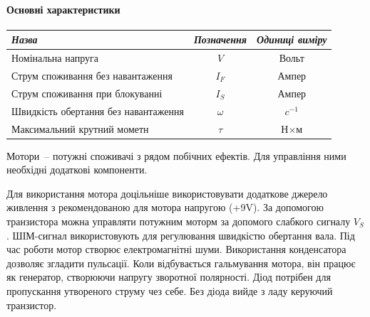 \documentclass[12pt,a4paper]{book}  %
\begin{document}
\paragraph{Основні характеристики}
\begin{center}
\begin{tabular}{|l|c|c|}
\hline
\textit{Назва} & \textit{Позначення} & \textit{Одиниці виміру} \\
\hline
Номінальна напруга & $V$ & Вольт \\
\hline		
Струм споживання без навантаження & $I_F$ & Ампер \\
\hline
Струм споживання при блокуванні & $I_S$ & Ампер \\
\hline
Швидкість обертання без навантаження & $\omega$ & $c^{-1}$ \\
\hline
Максимальний крутний мометн & $\tau$ & Н$\times$м \\
\hline
\end{tabular}
\end{center}

Мотори~-- потужні споживачі з рядом побічних ефектів. Для управління ними необхідні додаткові компоненти.

Для використання мотора доцільніше використовувати додаткове джерело живлення з рекомендованою для мотора напругою (+9V).
За допомогою транзистора можна управляти потужним моторм за допомого слабкого сигналу $V_S$.
ШІМ-сигнал використовують для регулювання швидкістю обертання вала.
Під час роботи мотор створює електромагнітні шуми. Використання конденсатора дозволяє згладити пульсації.
Коли відбувається гальмування мотора, він працює як генератор, створюючи напругу зворотної полярності. Діод потрібен для пропускання утвореного струму чез себе. Без діода вийде з ладу керуючий транзистор.

\begin{figure}[h!]
\label{ris:image}
\end{figure}
\end{document}
